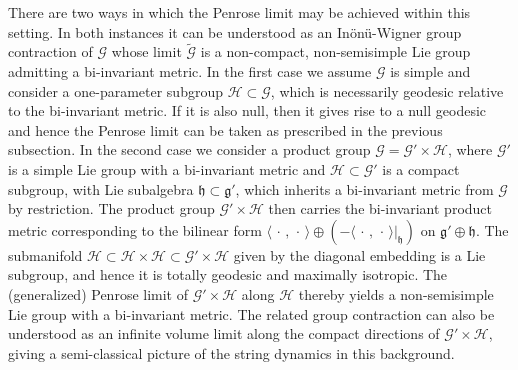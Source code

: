 \documentclass[11pt,a4paper]{article}
\begin{document}
There are two ways in which the Penrose limit may be achieved within
this setting. In both instances it can be understood as an
In\"on\"u-Wigner group contraction of $\mathcal{G}$ whose limit
$\widetilde{\mathcal{G}}$ is a non-compact, non-semisimple Lie group
admitting a bi-invariant metric. In the first case we assume $\mathcal
G$ is simple and consider a one-parameter subgroup
$\mathcal{H}\subset\mathcal{G}$, which is necessarily geodesic
relative to the bi-invariant metric. If it is also null, then it gives
rise to a null geodesic and hence the Penrose limit can be taken as
prescribed in the previous subsection. In the second case we consider
a product group $\mathcal{G}=\mathcal{G}'\times\mathcal{H}$, where
$\mathcal{G}'$ is a simple Lie group with a bi-invariant metric and
$\mathcal{H}\subset \mathcal{G}'$ is a compact subgroup, with Lie subalgebra
$\mathfrak{h}\subset\mathfrak{g}'$, which inherits a bi-invariant
metric from $\mathcal{G}$ by restriction. The product group
$\mathcal{G}'\times \mathcal{H}$ then carries the bi-invariant product
metric corresponding to the bilinear form
$\langle\,\cdot\,,\,\cdot\,\rangle\oplus
(-\langle\,\cdot\,,\,\cdot\,\rangle|_{\mathfrak{h}})$ on
$\mathfrak{g}'\oplus\mathfrak{h}$. The submanifold $\mathcal{H}\subset
\mathcal{H}\times\mathcal{H}\subset\mathcal{G}'\times \mathcal{H}$
given by the diagonal embedding is a Lie subgroup, and hence it is
totally geodesic and maximally isotropic. The (generalized) Penrose
limit of $\mathcal{G}'\times\mathcal{H}$ along $\mathcal{H}$ thereby
yields a non-semisimple Lie group with a bi-invariant metric. The
related group contraction can also be understood as an infinite volume limit
along the compact directions of $\mathcal{G}'\times \mathcal{H}$,
giving a semi-classical picture of the string dynamics in this
background.
\end{document}
